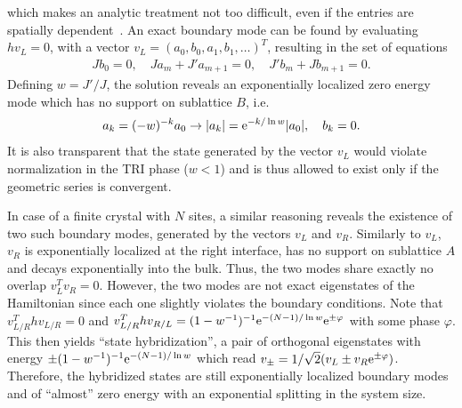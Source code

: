 which makes an analytic treatment not too difficult, even if the entries are spatially dependent~\cite{Asboth2016}.
An exact boundary mode can be found by evaluating $hv_L=0$, with a vector $v_L = (a_0,b_0,a_1,b_1,\dots)^T$, resulting in the set of equations
\begin{align}
    J b_0 = 0,
    \quad
    Ja_m + J' a_{m+1} = 0,
    \quad
    J' b_m + J b_{m+1} = 0.
\end{align}
Defining $w=J'/J$, the solution reveals an exponentially localized zero energy mode which has no support on sublattice $B$, i.e.
\begin{align}
    a_k=(-w)^{-k} a_0 \rightarrow |a_k| = \mathrm e^{-k/\ln w}|a_0|,
    \quad
    b_k = 0.
    \label{eq:boundary_mode}
\end{align}
It is also transparent that the state generated by the vector $v_L$ would violate normalization in the TRI phase ($w<1$) and is thus allowed to exist only if the geometric series is convergent.

In case of a finite crystal with $N$ sites, a similar reasoning reveals the existence of two such boundary modes, generated by the vectors $v_L$ and $v_R$.
Similarly to $v_L$, $v_R$ is exponentially localized at the right interface, has no support on sublattice $A$ and decays exponentially into the bulk.
Thus, the two modes share exactly no overlap $v_L^T v_R = 0$.
However, the two modes are not exact eigenstates of the Hamiltonian since each one slightly violates the boundary conditions.
Note that $v_{L/R}^T h v_{L/R} = 0$ and $v_{L/R}^T h v_{R/L} = (1-w^{-1})^{-1}\mathrm e^{-(N-1)/\ln w}\mathrm e^{\pm\varphi}$ with some phase $\varphi$.
This then yields ``state hybridization'', a pair of orthogonal eigenstates with energy $\pm(1-w^{-1})^{-1}\mathrm e^{-(N-1)/\ln w}$ which read $v_\pm = 1/\sqrt2(v_L \pm v_R\mathrm e^{\pm\varphi})$.
Therefore, the hybridized states are still exponentially localized boundary modes and of ``almost'' zero energy with an exponential splitting in the system size.
%
%
